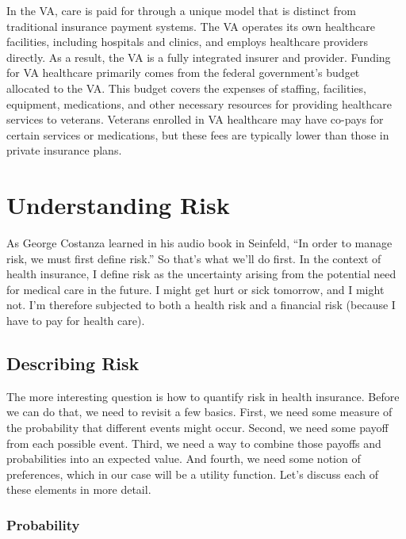 \documentclass[
  letterpaper,
  DIV=11,
  numbers=noendperiod]{scrreport}
\theoremstyle{definition}
\theoremstyle{remark}
\begin{document}
In the VA, care is paid for through a unique model that is distinct from
traditional insurance payment systems. The VA operates its own
healthcare facilities, including hospitals and clinics, and employs
healthcare providers directly. As a result, the VA is a fully integrated
insurer and provider. Funding for VA healthcare primarily comes from the
federal government's budget allocated to the VA. This budget covers the
expenses of staffing, facilities, equipment, medications, and other
necessary resources for providing healthcare services to veterans.
Veterans enrolled in VA healthcare may have co-pays for certain services
or medications, but these fees are typically lower than those in private
insurance plans.

\hypertarget{understanding-risk}{%
\chapter{Understanding Risk}\label{understanding-risk}}

As George Costanza learned in his audio book in Seinfeld, ``In order to
manage risk, we must first define risk.'' So that's what we'll do first.
In the context of health insurance, I define risk as the uncertainty
arising from the potential need for medical care in the future. I might
get hurt or sick tomorrow, and I might not. I'm therefore subjected to
both a health risk and a financial risk (because I have to pay for
health care).

\hypertarget{describing-risk}{%
\section{Describing Risk}\label{describing-risk}}

The more interesting question is how to quantify risk in health
insurance. Before we can do that, we need to revisit a few basics.
First, we need some measure of the probability that different events
might occur. Second, we need some payoff from each possible event.
Third, we need a way to combine those payoffs and probabilities into an
expected value. And fourth, we need some notion of preferences, which in
our case will be a utility function. Let's discuss each of these
elements in more detail.

\hypertarget{probability}{%
\subsection*{Probability}\label{probability}}
\end{document}
